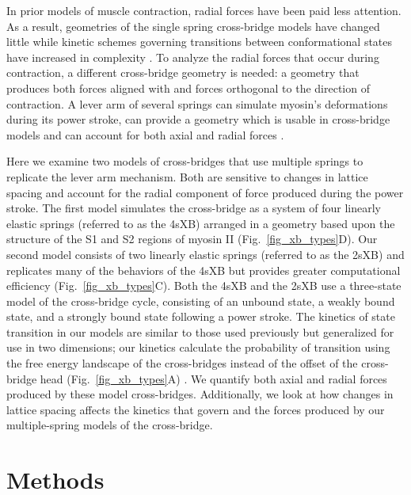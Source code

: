 \documentclass[]{article}
\begin{document}
In prior models of muscle contraction, radial forces have been paid less attention. 
As a result, geometries of the single spring cross-bridge models have changed little while kinetic schemes governing transitions between conformational states have increased in complexity \citep{Huxley1957, Pate1989, Daniel1998, Smith2008a}. %
To analyze the radial forces that occur during contraction, a different cross-bridge geometry is needed: a geometry that produces both forces aligned with and forces orthogonal to the direction of contraction. 
A lever arm of several springs can simulate myosin's deformations during its power stroke, can provide a geometry which is usable in cross-bridge models and can account for both axial and radial forces \citep{Houdusse2001}. 

Here we examine two models of cross-bridges that use multiple springs to replicate the lever arm mechanism.  
Both are sensitive to changes in lattice spacing and account for the radial component of force produced during the power stroke. 
The first model simulates the cross-bridge as a system of four linearly elastic springs (referred to as the 4sXB) arranged in a geometry based upon the structure of the S1 and S2 regions of myosin II (Fig.~\ref{fig_xb_types}D). 
Our second model consists of two linearly elastic springs (referred to as the 2sXB) and replicates many of the behaviors of the 4sXB but provides greater computational efficiency (Fig.~\ref{fig_xb_types}C). 
Both the 4sXB and the 2sXB use a three-state model of the cross-bridge cycle, consisting of an unbound state, a weakly bound state, and a strongly bound state following a power stroke. 
The kinetics of state transition in our models are similar to those used previously but generalized for use in two dimensions; our kinetics calculate the probability of transition using the free energy landscape of the cross-bridges instead of the offset of the cross-bridge head (Fig.~\ref{fig_xb_types}A) \citep{Pate1989, Daniel1998, Tanner2007}.
We quantify both axial and radial forces produced by these model cross-bridges.
Additionally, we look at how changes in lattice spacing affects the kinetics that govern and the forces produced by our multiple-spring models of the cross-bridge. 


\section*{Methods}  %
\end{document}

